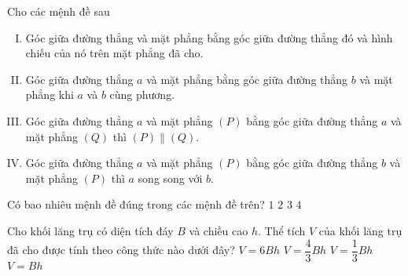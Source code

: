 \begin{ex}%
Cho các mệnh đề sau
\begin{enumerate}[(I)]
\item Góc giữa đường thẳng và mặt phẳng bằng góc giữa đường thẳng đó và hình chiếu của nó trên mặt phẳng đã cho.
\item Góc giữa đường thẳng $a$ và mặt phẳng bằng góc giữa đường thẳng $b$ và mặt phẳng khi $a$ và $b$ cùng phương.
\item Góc giữa đường thẳng $a$ và mặt phẳng $(P)$ bằng góc giữa đường thẳng $a$ và mặt phẳng  $(Q)$ thì $(P) \parallel (Q)$.
\item Góc giữa đường thẳng $a$ và mặt phẳng $(P)$ bằng góc giữa đường thẳng $b$ và mặt phẳng  $(P)$ thì $a$ song song với $b$.
\end{enumerate}
Có bao nhiêu mệnh đề đúng trong các mệnh đề trên?
\choice
{$1$}
{\True$2$}
{$3$}
{$4$}
\end{ex}

\begin{ex}%
Cho khối lăng trụ có diện tích đáy $B$ và chiều cao $h$. Thể tích $V$ của khối lăng trụ đã cho được tính theo công thức nào dưới đây?
\choice
{$V = 6 Bh$}
{$V = \dfrac{4}{3} B h$}
{$V = \dfrac{1}{3} B h$}
{\True $V = B h$}
\end{ex}

